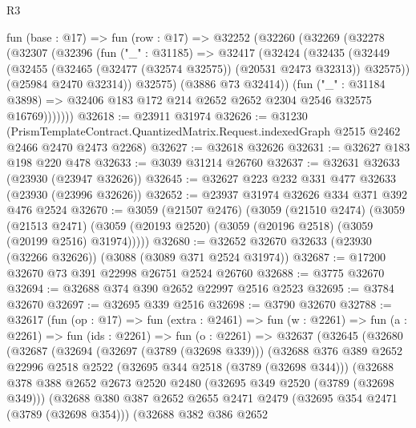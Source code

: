 \begin{lexlean}{R3}
\begin{coremodule}
    fun (base : @17) =>
    fun (row : @17) =>
    @32252
      (@32260
        (@32269
          (@32278
            (@32307
              (@32396
                (fun ("_" : @31185) =>
                @32417
                  (@32424
                    (@32435
                      (@32449
                        (@32455 (@32465 (@32477 (@32574 @32575)) (@20531 @2473 @32313)) @32575))
                      (@25984 @2470 @32314))
                    @32575)
                  (@3886 @73 @32414))
                (fun ("_" : @31184 @3898) =>
                @32406 @183 @172 @214 @2652 @2652 @2304 @2546 @32575 @16769)))))))
@32618 := @23911 @31974
@32626 := @31230
    (PrismTemplateContract.QuantizedMatrix.Request.indexedGraph @2515 @2462 @2466 @2470 @2473 @2268)
@32627 := @32618 @32626
@32631 := @32627 @183 @198 @220 @478
@32633 := @3039 @31214 @26760
@32637 := @32631 @32633 (@23930 (@23947 @32626))
@32645 := @32627 @223 @232 @331 @477 @32633 (@23930 (@23996 @32626))
@32652 := @23937 @31974 @32626 @334 @371 @392 @476 @2524
@32670 := @3059
    (@21507 @2476)
    (@3059
      (@21510 @2474)
      (@3059
        (@21513 @2471)
        (@3059 (@20193 @2520) (@3059 (@20196 @2518) (@3059 (@20199 @2516) @31974)))))
@32680 := @32652 @32670 @32633 (@23930 (@32266 @32626)) (@3088 (@3089 @371 @2524 @31974))
@32687 := @17200 @32670 @73 @391 @22998 @26751 @2524 @26760
@32688 := @3775 @32670
@32694 := @32688 @374 @390 @2652 @22997 @2516 @2523
@32695 := @3784 @32670
@32697 := @32695 @339 @2516
@32698 := @3790 @32670
@32788 := @32617
    (fun (op : @17) =>
    fun (extra : @2461) =>
    fun (w : @2261) =>
    fun (a : @2261) =>
    fun (ids : @2261) =>
    fun (o : @2261) =>
    @32637
      (@32645
        (@32680
          (@32687
            (@32694
              (@32697 (@3789 (@32698 @339)))
              (@32688
                @376
                @389
                @2652
                @22996
                @2518
                @2522
                (@32695 @344 @2518 (@3789 (@32698 @344)))
                (@32688
                  @378
                  @388
                  @2652
                  @2673
                  @2520
                  @2480
                  (@32695 @349 @2520 (@3789 (@32698 @349)))
                  (@32688
                    @380
                    @387
                    @2652
                    @2655
                    @2471
                    @2479
                    (@32695 @354 @2471 (@3789 (@32698 @354)))
                    (@32688
                      @382
                      @386
                      @2652

\end{coremodule}
\end{lexlean}
